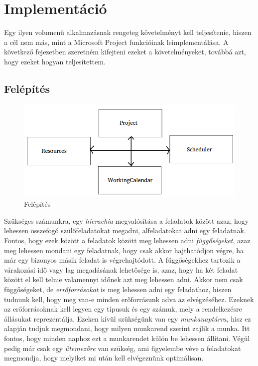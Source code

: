 \chapter{Implementáció}\label{sect:Implement}

Egy ilyen volumenű alkalmazásnak rengeteg követelményt kell teljesítenie, hiszen a cél nem más, mint a Microsoft Project funkcióinak leimplementálása. A következő fejezetben szeretném kifejteni ezeket a követelményeket, továbbá azt, hogy ezeket hogyan teljesítettem.
\section{Felépítés}

\begin{figure}[!ht]
\centering
\includegraphics[width=\textwidth, keepaspectratio]{figures/project1.png}
\caption{Felépítés} 
\label{fig:project1}
\end{figure} 

Szükséges számunkra, egy \textit{hierachia} megvalósítása a feladatok között azaz, hogy lehessen összefogó szülőfeladatokat megadni, alfeladatokat adni egy feladatnak. Fontos, hogy ezek között a feladatok között meg lehessen adni \textit{függőségeket}, azaz meg lehessen mondani egy feladatnak, hogy csak akkor hajthatódjon végre, ha már egy bizonyos másik feladat is végrehajtódott. A függőségekhez tartozik a várakozási idő vagy lag megadásának lehetősége is, azaz, hogy ha két feladat között el kell telnie valamennyi időnek azt meg lehessen adni. Akkor nem csak függőségeket, de \textit{errőforrásokat} is meg lehessen adni egy feladathoz, hiszen tudnunk kell, hogy meg van-e minden erőforrásunk adva az elvégzéséhez. Ezeknek az erőforrásoknak kell legyen egy típusuk és egy számuk, mely a rendelkezésre állásukat reprezentálja. Ezeken kívül szükségünk van egy \textit{munkanaptárra}, hisz ez alapján tudjuk megmondani, hogy milyen munkarend szerint zajlik a munka. Itt fontos, hogy minden naphoz ezt a munkarendet külön be lehessen állítani. Végül pedig már csak egy \textit{ütemezőre} van szükség, ami figyelembe véve a feladatokat megmondja, hogy melyiket mi után kell elvégeznünk optimálisan.


